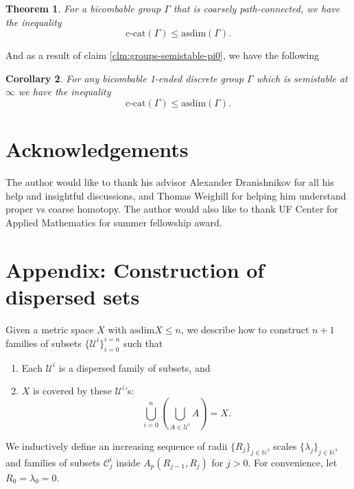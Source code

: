 \documentclass {amsart}
\newcommand {\ccat}     {\text{c-cat}}
\newcommand {\asdim}    {\text{asdim}}
\newcommand {\N}        {\mathbb{N}}
\newcommand {\U}        {\mathcal{U}}
\newcommand {\C}        {\mathcal{C}}
\newtheorem   {theorem}               {Theorem}       [section]
\newtheorem   {corollary}   [theorem] {Corollary}
\theoremstyle {definition}
\begin{document}
\begin{theorem} \label{thm:ccat-asdim-grp}
    For a bicombable group \( \Gamma \) that is coarsely path-connected, we have the
    inequality
    \[
        \ccat(\Gamma) \leq \asdim (\Gamma)
    .\]
\end{theorem}

And as a result of claim \ref{clm:groups-semistable-pi0}, we have the following

\begin{corollary} \label{cor:ccat-asdim-grp-ends}
    For any bicombable 1-ended discrete group \( \Gamma \) which is semistable at
    \( \infty \) we have the inequality
    \[ 
        \ccat(\Gamma) \leq \asdim (\Gamma) 
    .\]
\end{corollary}

\section {Acknowledgements}
The author would like to thank his advisor Alexander Dranishnikov for all his
help and insightful discussions, and Thomas Weighill for helping him understand
proper vs coarse homotopy. The author would also like to thank UF Center for
Applied Mathematics for summer fellowship award.

\printbibliography

\appendix
\newpage
\section {Appendix: Construction of dispersed sets}

Given a metric space \( X \) with \( \asdim X \leq n \), we describe how to
construct \( n+1 \) families of subsets \( \{ \U^i \}_{i=0} ^{i=n} \) such
that
\begin{enumerate}
\item Each \( \U^i \) is a dispersed family of subsets, and
\item \( X \) is covered by these \( \U^i \)'s:
  \[
    \bigcup _{i=0} ^{n} \left(
      \bigcup _{A \in \U^i} A
    \right) = X.
  \]
\end{enumerate}

We inductively define an increasing sequence of radii \( \{ R_j \}_{j \in \N}
\), scales \( \{ \lambda_j \} _{j \in \N} \), and families of subsets \( \C^i_j
\) inside \( A_p (R_{j-1}, R_j) \) for \( j > 0 \). For convenience, let \( R_0
= \lambda_0 = 0 \).
\end{document}

